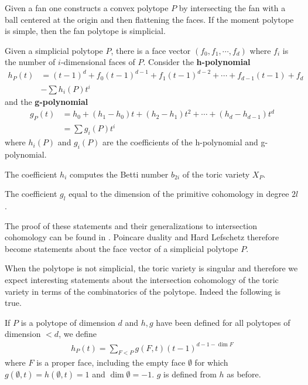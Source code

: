 \documentclass[12pt]{article}
\begin{document}
Given a fan one constructs a convex polytope $P$ by intersecting the fan with a
ball centered at the origin and then flattening the faces. If the
moment polytope is simple, then the fan polytope is simplicial.

\begin{definition}
    Given a simplicial polytope $P$, there is a face vector $(f_0,f_1,\cdots,f_d)$
    where $f_i$ is the number of $i$-dimensional faces of $P$. Consider the
    \textbf{h-polynomial} \begin{align*}
        h_P(t) & = (t-1)^d + f_0(t-1)^{d-1} + f_1(t-1)^{d-2} + \cdots + f_{d-1}(t-1) + f_d \\
               & - \sum h_i(P) t^i
    \end{align*}
    and the \textbf{g-polynomial} \begin{align*}
        g_P(t) & = h_0 + (h_1 - h_0)t + (h_2 - h_1)t^2 + \cdots + (h_d - h_{d-1})t^d \\
               & = \sum g_i(P)t^i
    \end{align*} where $h_i(P)$ and $g_i(P)$ are the coefficients of the h-polynomial and g-polynomial.
\end{definition}

\begin{proposition}
    The coefficient $h_i$ computes the Betti number $b_{2i}$ of the toric variety $X_P$.
\end{proposition}

\begin{proposition}
    The coefficient $g_l$ equal to the dimension of
    the primitive cohomology in degree $2l$.
\end{proposition}

The proof of these statements and their generalizations
to intersection cohomology can be found in \cite{goresky}.
Poincare duality and Hard Lefschetz therefore become statements about
the face vector of a simplicial polytope $P$.



When the polytope is not simplicial, the toric variety is singular and therefore
we expect interesting statements about the intersection cohomology of the toric variety
in terms of the combinatorics of the polytope. Indeed the following is true.

\begin{definition}
    If $P$ is a polytope of dimension $d$ and $h,g$ have been defined for all
    polytopes of dimension $<d$, we define \begin{align*}
        h_P(t) = \sum_{F<P}g(F,t)(t-1)^{d-1-\dim F}
    \end{align*} where $F$ is a proper face, including the empty face $\emptyset$ for
    which $g(\emptyset,t) = h(\emptyset,t) = 1$ and $\dim \emptyset = -1$. $g$
    is defined from $h$ as before.
\end{definition}
\end{document}
